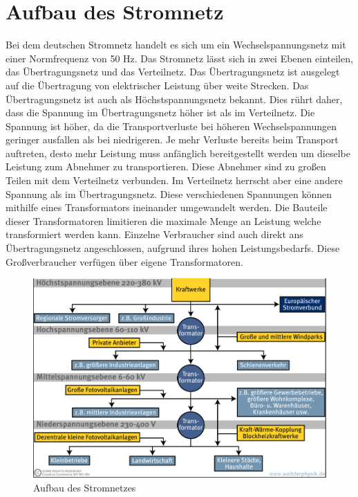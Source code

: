 \section{Aufbau des Stromnetz}
\label{capBack:Stromnetz}
Bei dem deutschen Stromnetz handelt es sich um ein Wechselspannungsnetz mit einer Normfrequenz von 50 Hz. Das Stromnetz lässt sich in zwei Ebenen einteilen, das Übertragungsnetz und das Verteilnetz. Das Übertragungsnetz ist ausgelegt auf die Übertragung von elektrischer Leistung über weite Strecken. Das Übertragungsnetz ist auch als Höchstspannungsnetz bekannt. Dies rührt daher, dass die Spannung im Übertragungsnetz höher ist als im Verteilnetz. Die Spannung ist höher, da die Transportverluste bei höheren Wechselspannungen geringer ausfallen als bei niedrigeren. Je mehr Verluste bereits beim Transport auftreten, desto mehr Leistung muss anfänglich bereitgestellt werden um dieselbe Leistung zum Abnehmer zu transportieren. Diese Abnehmer sind zu großen Teilen mit dem Verteilnetz verbunden. Im Verteilnetz herrscht aber eine andere Spannung als im Übertragungsnetz. Diese verschiedenen Spannungen können mithilfe eines Transformators ineinander umgewandelt werden. Die Bauteile dieser Transformatoren limitieren die maximale Menge an Leistung welche transformiert werden kann. Einzelne Verbraucher sind auch direkt ans Übertragungsnetz angeschlossen, aufgrund ihres hohen Leistungsbedarfs. Diese Großverbraucher verfügen über eigene Transformatoren.
\begin{figure}[h!]
	\includegraphics[width=\linewidth]{img/Stromnetz1.png}
	\caption{Aufbau des Stromnetzes}
	\label{Abb1_Stromnetz}
\end{figure}


